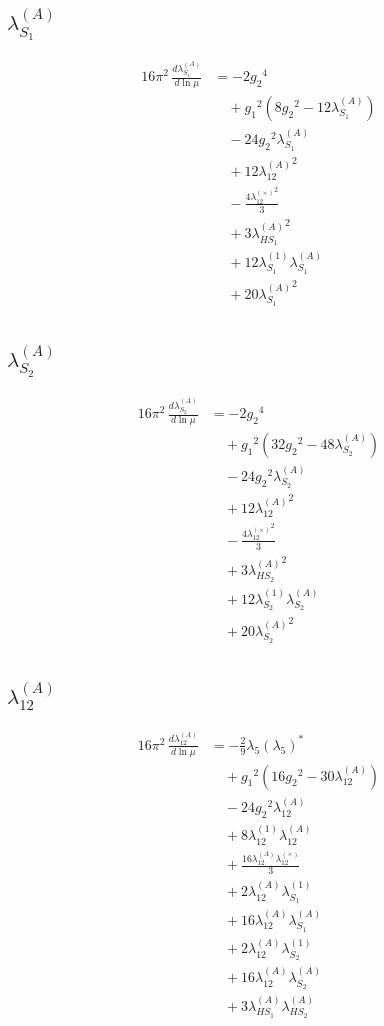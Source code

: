\documentclass[10pt,a4paper]{article}
\begin{document}
\subsection*{$\lambda_{S_1}^{(A)}$}
\begin{align*}
16\pi^2\,\frac{d \lambda_{S_1}^{(A)}}{d\ln\mu} &=-2 {g_2}^4 \\
&\quad +{g_1}^2 \left(8 {g_2}^2-12 {\lambda_{S_1}^{(A)}}\right) \\
&\quad -24 {g_2}^2 {\lambda_{S_1}^{(A)}} \\
&\quad +12 {\lambda_{12}^{(A)}}^2 \\
&\quad -\frac{4 {\lambda_{12}^{(\times)}}^2}{3} \\
&\quad +3 {\lambda_{HS_1}^{(A)}}^2 \\
&\quad +12 {\lambda_{S_1}^{(1)}} {\lambda_{S_1}^{(A)}} \\
&\quad +20 {\lambda_{S_1}^{(A)}}^2 \\
\end{align*}
\subsection*{$\lambda_{S_2}^{(A)}$}
\begin{align*}
16\pi^2\,\frac{d \lambda_{S_2}^{(A)}}{d\ln\mu} &=-2 {g_2}^4 \\
&\quad +{g_1}^2 \left(32 {g_2}^2-48 {\lambda_{S_2}^{(A)}}\right) \\
&\quad -24 {g_2}^2 {\lambda_{S_2}^{(A)}} \\
&\quad +12 {\lambda_{12}^{(A)}}^2 \\
&\quad -\frac{4 {\lambda_{12}^{(\times)}}^2}{3} \\
&\quad +3 {\lambda_{HS_2}^{(A)}}^2 \\
&\quad +12 {\lambda_{S_2}^{(1)}} {\lambda_{S_2}^{(A)}} \\
&\quad +20 {\lambda_{S_2}^{(A)}}^2 \\
\end{align*}
\subsection*{$\lambda_{12}^{(A)}$}
\begin{align*}
16\pi^2\,\frac{d \lambda_{12}^{(A)}}{d\ln\mu} &=-\frac{2}{9} {\lambda_5} \left({\lambda_5}\right)^{*} \\
&\quad +{g_1}^2 \left(16 {g_2}^2-30 {\lambda_{12}^{(A)}}\right) \\
&\quad -24 {g_2}^2 {\lambda_{12}^{(A)}} \\
&\quad +8 {\lambda_{12}^{(1)}} {\lambda_{12}^{(A)}} \\
&\quad +\frac{16 {\lambda_{12}^{(A)}} {\lambda_{12}^{(\times)}}}{3} \\
&\quad +2 {\lambda_{12}^{(A)}} {\lambda_{S_1}^{(1)}} \\
&\quad +16 {\lambda_{12}^{(A)}} {\lambda_{S_1}^{(A)}} \\
&\quad +2 {\lambda_{12}^{(A)}} {\lambda_{S_2}^{(1)}} \\
&\quad +16 {\lambda_{12}^{(A)}} {\lambda_{S_2}^{(A)}} \\
&\quad +3 {\lambda_{HS_1}^{(A)}} {\lambda_{HS_2}^{(A)}} \\
\end{align*}
\end{document}
